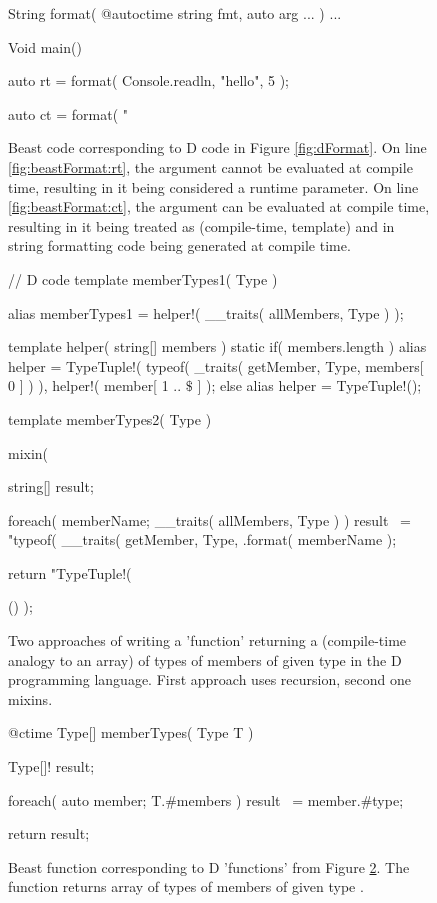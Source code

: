 \documentclass{ExcelAtFIT}
\begin{document}
\begin{figure}[h]
	\begin{code}
String format( @autoctime string fmt, auto arg ... ) { ... }

Void main() {
	auto rt = format( Console.readln, "hello", 5 );$\label{fig:beastFormat:rt}$
	
	auto ct = format( "%
}
	\end{code}
	\caption{Beast code corresponding to D code in Figure \ref{fig:dFormat}. On line \ref{fig:beastFormat:rt}, the  argument cannot be evaluated at compile time, resulting in it being considered a runtime parameter. On line \ref{fig:beastFormat:ct}, the argument can be evaluated at compile time, resulting in it being treated as \ctime (compile-time, template) and in string formatting code being generated at compile time.}
	\label{fig:beastFormat}
\end{figure}

\begin{figure}[h]
	\begin{dcode}
// D code
template memberTypes1( Type ) {
	alias memberTypes1 = helper!( __traits( allMembers, Type ) );
	
	template helper( string[] members ) {
		static if( members.length )
			alias helper = TypeTuple!(
				typeof( _traits( getMember, Type, members[ 0 ] ) ),
				helper!( member[ 1 .. $\$$ ] 
				);
		else
			alias helper = TypeTuple!();
	}
}

template memberTypes2( Type ) {
	mixin( {
		string[] result;
		
		foreach( memberName; __traits( allMembers, Type ) )
			result ~=
				"typeof( __traits( getMember, Type, %
				.format( memberName );	
		
		return "TypeTuple!( %
	}() );
}
	\end{dcode}
	\caption{Two approaches of writing a 'function' returning a  (compile-time analogy to an array) of types of members of given type  in the D programming language. First approach uses recursion, second one mixins.}
	\label{fig:dMemberTypes}
\end{figure}

\begin{figure}[h]
	\begin{code}
@ctime Type[] memberTypes( Type T ) {
	Type[]! result;
	
	foreach( auto member; T.#members )
	result ~= member.#type;
	
	return result;
}
	\end{code}
	\caption{Beast function corresponding to D 'functions' from Figure \ref{fig:dMemberTypes}. The function returns array of types of members of given type .}
	\label{fig:beastMemberTypes}
\end{figure}
\end{document}
